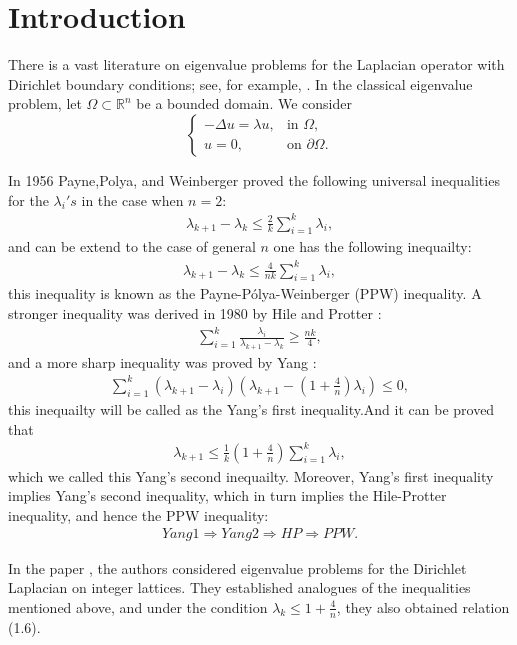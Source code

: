 \documentclass[11pt]{article}
\theoremstyle{definition}
\theoremstyle{remark}
\numberwithin{equation}{section}
\begin{document}
\section{Introduction}
\noindent
There is a vast literature on eigenvalue problems for the Laplacian operator with
Dirichlet boundary conditions; see, for example, \cite{payne1955ratio,thompson1969ratio,hile1980inequalities,chen2016estimates}.
In the classical eigenvalue problem, let $\Omega \subset \mathbb{R}^n$ be a bounded
domain. We consider
\[
\begin{cases}
-\Delta u = \lambda u, & \text{in } \Omega, \\
u = 0, & \text{on } \partial \Omega.
\end{cases}
\]
\par\noindent
In 1956 Payne,Polya, and Weinberger \cite{payne1955ratio} proved the following universal inequalities for the $\lambda_i's$
in the case when $n=2$:
\begin{align*}
\lambda_{k+1}-\lambda_{k}\le \frac{2}{k} \sum_{i=1}^{k}\lambda_i,
\end{align*}
and can be extend to the case of general $n$ one has the following inequailty:
\begin{align*}
  \lambda_{k+1}-\lambda_{k}\le \frac{4}{nk} \sum_{i=1}^{k}\lambda_i,
\end{align*}
this inequality is known as the Payne-Pólya-Weinberger (PPW) inequality.
A stronger inequality was derived in 1980 by Hile and Protter \cite{hile1980inequalities}:
\begin{align*}
\sum_{i=1}^{k}\frac{\lambda_i}{\lambda_{k+1}-\lambda_k}\ge \frac{nk}{4},
\end{align*}
and a more sharp inequality was proved by Yang \cite{yang1991estimate}:
\begin{align*}
\sum_{i=1}^{k}(\lambda_{k+1}-\lambda_i)(\lambda_{k+1}-(1+\frac{4}{n})\lambda_i)\le0,
\end{align*}
this inequailty will be called as the Yang's first inequality.And it can be proved that
\begin{align*}
\lambda_{k+1}\le \frac{1}{k}(1+\frac{4}{n})\sum_{i=1}^{k}\lambda_i,
\end{align*}
which we called this Yang's second inequailty.
Moreover, Yang's first inequality implies Yang's second inequality, which in turn
implies the Hile-Protter inequality, and hence the PPW inequality:
\begin{align*}
Yang 1 \Rightarrow Yang 2 \Rightarrow HP \Rightarrow PPW.
\end{align*}\par
In the paper \cite{hua2023payne}, the authors considered eigenvalue problems for the
Dirichlet Laplacian on integer lattices. They established analogues of the
inequalities mentioned above, and under the condition $\lambda_k \le 1 + \frac{4}{n}$,
they also obtained relation (1.6).
\end{document}
